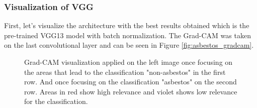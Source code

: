 \subsubsection{Visualization of VGG}

First, let's visualize the architecture with the best results obtained which is the pre-trained VGG13 model with batch normalization. The Grad-CAM was taken on the last convolutional layer and can be seen in Figure \ref{fig:asbestos_gradcam}. 

\begin{figure}[!h]
\centering
\caption{Grad-CAM visualization applied on the left image once focusing on the areas that lead to the classification "non-asbestos" in the first row. And once focusing on the classification "asbestos" on the second row. Areas in red show high relevance and violet shows low relevance for the classification.}


\end{figure}
